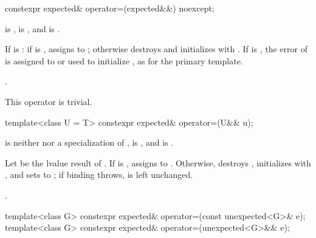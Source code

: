 %
\begin{itemdecl}
constexpr expected& operator=(expected&&) noexcept;
\end{itemdecl}

\begin{itemdescr}
\pnum
\constraints
{} is ,  is , and  is .

\pnum
\effects
If  is : if  is , assigns  to ; otherwise destroys  and initializes  with . If  is , the error of  is assigned to or used to initialize , as for the primary template.

\pnum
\returns
{}.

\pnum
\remarks
This operator is trivial.
\end{itemdescr}

%
\begin{itemdecl}
template<class U = T> constexpr expected& operator=(U&& u);
\end{itemdecl}

\begin{itemdescr}
\pnum
\constraints
{} is neither  nor a specialization of ,  is , and  is .

\pnum
\effects
Let  be the lvalue result of . If  is , assigns  to . Otherwise, destroys , initializes  with , and sets  to ; if binding  throws,  is left unchanged.

\pnum
\returns
{}.
\end{itemdescr}

%
\begin{itemdecl}
template<class G> constexpr expected& operator=(const unexpected<G>& e);
template<class G> constexpr expected& operator=(unexpected<G>&& e);
\end{itemdecl}

